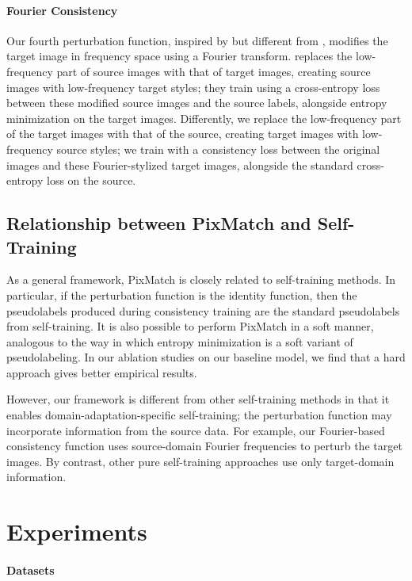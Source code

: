 \documentclass[final]{cvpr}
\begin{document}
\paragraph{Fourier Consistency} Our fourth perturbation function, inspired by but different from \cite{yang2020fda}, modifies the target image in frequency space using a Fourier transform. \cite{yang2020fda} replaces the low-frequency part of source images with that of target images, creating source images with low-frequency target styles; they train using a cross-entropy loss between these modified source images and the source labels, alongside entropy minimization on the target images. Differently, we replace the low-frequency part of the target images with that of the source, creating target images with low-frequency source styles; we train with a consistency loss between the original images and these Fourier-stylized target images, alongside the standard cross-entropy loss on the source. 

\subsection{Relationship between PixMatch and Self-Training}

As a general framework, PixMatch is closely related to self-training methods. In particular, if the perturbation function is the identity function, then the pseudolabels produced during consistency training are the standard pseudolabels from self-training. It is also possible to perform PixMatch in a soft manner, analogous to the way in which entropy minimization is a soft variant of pseudolabeling. In our ablation studies on our baseline model, we find that a hard approach gives better empirical results. 

However, our framework is different from other self-training methods in that it enables domain-adaptation-specific self-training; the perturbation function may incorporate information from the source data. For example, our Fourier-based consistency function uses source-domain Fourier frequencies to perturb the target images. By contrast, other pure self-training approaches \cite{cbst,maxsquare,advent} use only target-domain information. 

\section{Experiments}
\paragraph{Datasets}
\end{document}
